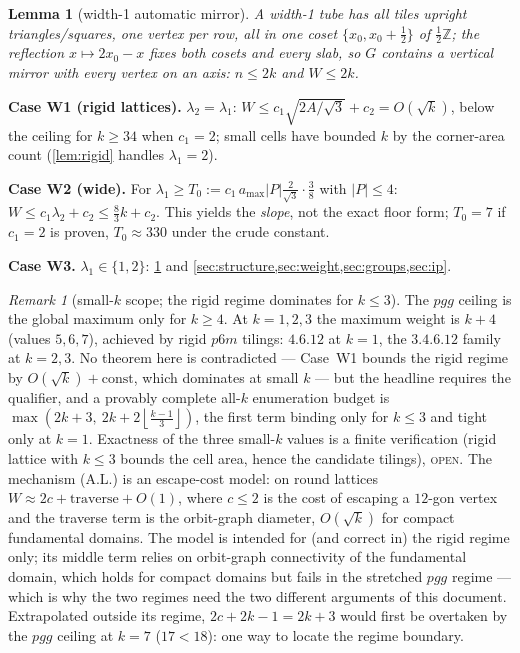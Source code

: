 \documentclass[11pt,a4paper,oneside]{article}
\theoremstyle{plain}
\newtheorem{lemma}[theorem]{Lemma}
\theoremstyle{definition}
\theoremstyle{remark}
\newtheorem{remark}[theorem]{Remark}
\newcommand{\ZZ}{\mathbb{Z}}
\newcommand{\fl}[1]{\left\lfloor #1 \right\rfloor}
\newcommand{\ceilw}{2k + 2\fl{\tfrac{k-1}{3}}}
\newcommand{\statOPEN}{\textcolor{red!60!black}{\textsc{open}}}
\begin{document}
\begin{lemma}[width-1 automatic mirror]\label{lem:width1}
A width-1 tube has all tiles upright triangles/squares, one vertex per row, all in one
coset $\{x_0, x_0 + \tfrac12\}$ of $\tfrac12\ZZ$; the reflection $x \mapsto 2x_0 - x$ fixes
both cosets and every slab, so $G$ contains a vertical mirror with every vertex on an axis:
$n \le 2k$ and $W \le 2k$.
\end{lemma}

\textbf{Case W1 (rigid lattices).} $\lambda_2 = \lambda_1$: $W \le c_1\sqrt{2A/\sqrt3} +
c_2 = O(\sqrt k)$, below the ceiling for $k \ge 34$ when $c_1 = 2$; small cells have
bounded $k$ by the corner-area count (\cref{lem:rigid} handles $\lambda_1 = 2$).

\textbf{Case W2 (wide).} For $\lambda_1 \ge T_0 := c_1\, a_{\max} |P| \tfrac{2}{\sqrt3}
\cdot \tfrac38$ with $|P| \le 4$: $W \le c_1\lambda_2 + c_2 \le \tfrac83 k + c_2$. This
yields the \emph{slope}, not the exact floor form; $T_0 = 7$ if $c_1 = 2$ is proven,
$T_0 \approx 330$ under the crude constant.

\textbf{Case W3.} $\lambda_1 \in \{1, 2\}$: \cref{lem:width1} and
\cref{sec:structure,sec:weight,sec:groups,sec:ip}.

\begin{remark}[small-$k$ scope; the rigid regime dominates for $k \le 3$]\label{rem:smallk}
The $pgg$ ceiling is the global maximum only for $k \ge 4$. At $k = 1, 2, 3$ the maximum
weight is $k + 4$ (values $5, 6, 7$), achieved by rigid $p6m$ tilings: $4.6.12$ at $k = 1$,
the $3.4.6.12$ family at $k = 2, 3$. No theorem here is contradicted --- Case~W1 bounds the
rigid regime by $O(\sqrt k) + \mathrm{const}$, which dominates at small $k$ --- but the
headline requires the qualifier, and a provably complete all-$k$ enumeration budget is
$\max(2k + 3,\ \ceilw)$, the first term binding only for $k \le 3$ and tight only at
$k = 1$. Exactness of the three small-$k$ values is a finite verification (rigid lattice
with $k \le 3$ bounds the cell area, hence the candidate tilings), \statOPEN. The mechanism
(A.L.) is an escape-cost model: on round lattices $W \approx 2c + \mathrm{traverse} + O(1)$,
where $c \le 2$ is the cost of escaping a $12$-gon vertex and the traverse term is the
orbit-graph diameter, $O(\sqrt k)$ for compact fundamental domains. The model is intended for (and correct in) the rigid regime only; its middle term relies on
orbit-graph connectivity of the fundamental domain, which holds for compact domains but
fails in the stretched $pgg$ regime --- which is why the two regimes need the two different
arguments of this document. Extrapolated outside its regime, $2c + 2k - 1 = 2k + 3$ would
first be overtaken by the $pgg$ ceiling at $k = 7$ ($17 < 18$): one way to locate the
regime boundary.
\end{remark}
\end{document}
